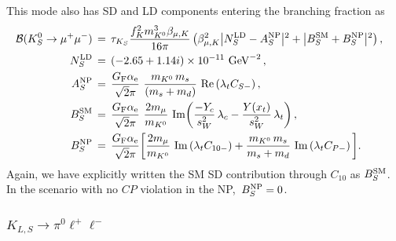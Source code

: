 \documentclass[amsmath,amssymb,aps,nofootinbib,prd,preprint,superscriptaddress,tightenlines,a4paper,bm]{revtex4-2}
\begin{document}
This mode also has SD and LD components entering the branching fraction as~\cite{Chobanova:2017rkj,Neshatpour:2022fak}
\begin{align}
    \label{eq:brKSmumuComplete}
{\cal B}(K^0_{S} \to \mu^+ \mu^- ) & \,=\, \tau_{K_S}  \frac{f_K^2 m_{K^0}^3 \beta_{\mu,K}} { 16 \pi} \left(\beta_{\mu,K}^2 \big| N_S^{\rm LD}-A_S^{\rm NP} \big| {}^2 + \big| B_S^{\rm SM}+B_S^{\rm NP} \big| {}^2 \right) , \nonumber \\
N_S^{\rm LD} & \,=\, (-2.65 + 1.14 i )\times 10^{-11} {\rm~GeV}^{-2} \,, \nonumber \\
A_S^{\rm NP} & \,=\, \frac{G_{\rm F} \alpha_{\rm e}}{\sqrt{2}\pi}~ \frac{ m_{K^0}\, m_{s}}{(m_s +m_d)} {\rm~Re}\left(\lambda_tC_{S-}\right) , \nonumber \\
B_S^{\rm SM} & \,=\, \frac{G_{\rm F} \alpha_{\rm e}}{\sqrt{2}\pi}~ \frac{2m_\mu}{m_{K^0}} {\rm~Im} \bigg( \frac{-Y_c}{s_W^2}\, \lambda_c-\frac{Y(x_t)}{s_W^2}\, \lambda_t \bigg) \,, \nonumber \\
B_S^{\rm NP} & \,=\, \frac{G_{\rm F} \alpha_{\rm e}}{\sqrt{2}\pi} \bigg[ \frac{2m_\mu}{m_{K^0}} {\rm~Im} \left(\lambda_t C_{10-}\right) + \frac{m_{K^0}\, m_{s}}{m_s +m_d}{\rm~Im}\left(\lambda_t  C_{P-}\right) \bigg] . &
\end{align}
Again, we have  explicitly written the SM SD contribution through $C_{10}$ as $B_S^{\rm SM}$.
In the scenario with no $CP$ violation in the NP, \,$B_S^{\rm NP}=0$.

\subsubsection{\boldmath$K_{L,S}^{}\to \pi^0\ell^+\ell^-$}   \vspace{-1em}
\end{document}
